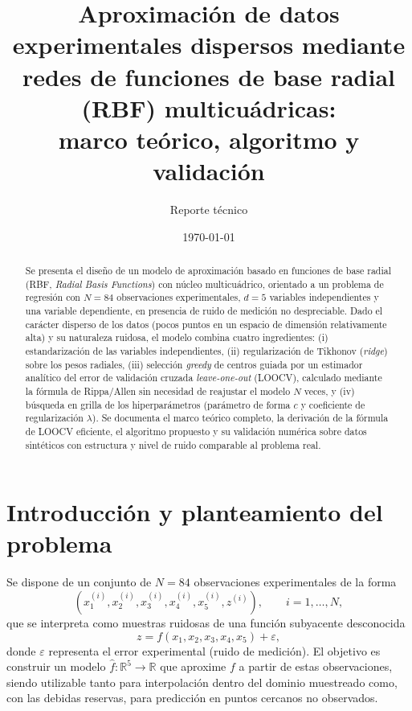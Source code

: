 \documentclass[11pt,a4paper]{article}
\title{\Large \textbf{Aproximaci\'on de datos experimentales dispersos mediante \\
redes de funciones de base radial (RBF) multicu\'adricas: \\
marco te\'orico, algoritmo y validaci\'on}}
\author{Reporte t\'ecnico}
\date{\today}
\newcommand{\R}{\mathbb{R}}
\begin{document}
\maketitle

\begin{abstract}
\noindent
Se presenta el dise\~no de un modelo de aproximaci\'on basado en funciones de
base radial (RBF, \emph{Radial Basis Functions}) con n\'ucleo multicu\'adrico,
orientado a un problema de regresi\'on con $N=84$ observaciones experimentales,
$d=5$ variables independientes y una variable dependiente, en presencia de
ruido de medici\'on no despreciable. Dado el car\'acter disperso de los datos
(pocos puntos en un espacio de dimensi\'on relativamente alta) y su naturaleza
ruidosa, el modelo combina cuatro ingredientes: (i) estandarizaci\'on de las
variables independientes, (ii) regularizaci\'on de Tikhonov (\emph{ridge})
sobre los pesos radiales, (iii) selecci\'on \emph{greedy} de centros guiada
por un estimador anal\'itico del error de validaci\'on cruzada
\emph{leave-one-out} (LOOCV), calculado mediante la f\'ormula de Rippa/Allen
sin necesidad de reajustar el modelo $N$ veces, y (iv) b\'usqueda en grilla
de los hiperpar\'ametros (par\'ametro de forma $c$ y coeficiente de
regularizaci\'on $\lambda$). Se documenta el marco te\'orico completo,
la derivaci\'on de la f\'ormula de LOOCV eficiente, el algoritmo propuesto
y su validaci\'on num\'erica sobre datos sint\'eticos con estructura y
nivel de ruido comparable al problema real.
\end{abstract}

\tableofcontents

\section{Introducci\'on y planteamiento del problema}

Se dispone de un conjunto de $N = 84$ observaciones experimentales de la forma
\[
\left(x_1^{(i)}, x_2^{(i)}, x_3^{(i)}, x_4^{(i)}, x_5^{(i)}, z^{(i)}\right),
\qquad i = 1, \dots, N,
\]
que se interpreta como muestras ruidosas de una funci\'on subyacente desconocida
\[
z = f(x_1, x_2, x_3, x_4, x_5) + \varepsilon,
\]
donde $\varepsilon$ representa el error experimental (ruido de medici\'on). El
objetivo es construir un modelo $\hat f: \R^5 \to \R$ que aproxime $f$ a partir
de estas observaciones, siendo utilizable tanto para interpolaci\'on dentro del
dominio muestreado como, con las debidas reservas, para predicci\'on en puntos
cercanos no observados.
\end{document}

